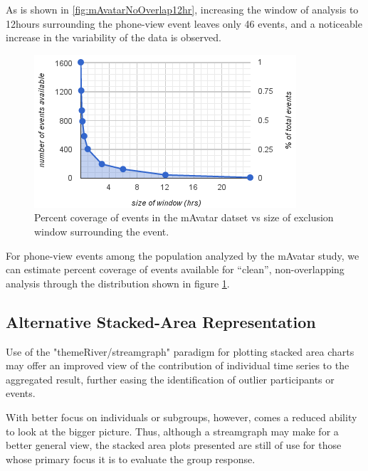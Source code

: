 As is shown in \ref{fig:mAvatarNoOverlap12hr}, increasing the window of analysis to 12hours surrounding the phone-view event leaves only 46 events, and a noticeable increase in the variability of the data is observed.

\begin{figure}
\centering
\includegraphics[width=0.9\columnwidth]{./img/events_v_windowSize.png}
\caption{Percent coverage of events in the mAvatar datset vs size of exclusion window surrounding the event.}
\label{fig:eventsVwindow}
\end{figure}

For phone-view events among the population analyzed by the mAvatar study, we can estimate percent coverage of events available for ``clean'', non-overlapping analysis through the distribution shown in figure \ref{fig:eventsVwindow}.

\subsection{Alternative Stacked-Area Representation}
Use of the "themeRiver/streamgraph" \cite{havre2000, byron2008} paradigm for plotting stacked area charts may offer an improved view of the contribution of individual time series to the aggregated result, further easing the identification of outlier participants or events.

With better focus on individuals or subgroups, however, comes a reduced ability to look at the bigger picture.
Thus, although a streamgraph may make for a better general view, the stacked area plots presented are still of use for those whose primary focus it is to evaluate the group response.



